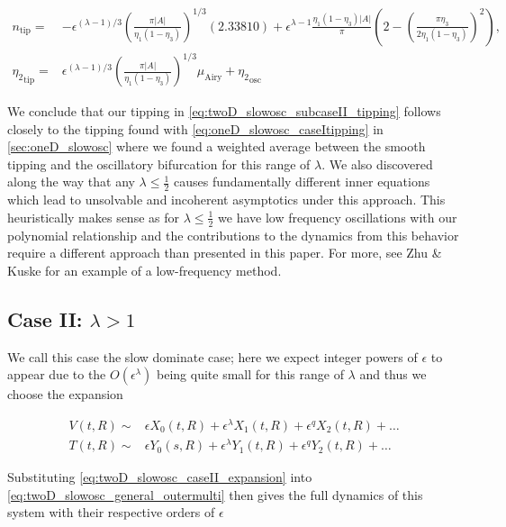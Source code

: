 \begin{equation}\label{eq:twoD_slowosc_subcaseII_tipping}
\begin{aligned}
n_{\text{tip}} =& -\epsilon^{(\lambda-1)/3}\left(\frac{\pi|A|}{\eta_1(1-\eta_3)}\right)^{1/3}(2.33810)+\epsilon^{\lambda-1}\frac{\eta_1(1-\eta_3)|A|}{\pi}\left(2-\left(\frac{\pi\eta_3}{2\eta_1(1-\eta_3)}\right)^2\right),\\
{\eta_2}_{\text{tip}} =& \epsilon^{(\lambda-1)/3}\left(\frac{\pi|A|}{\eta_1(1-\eta_3)}\right)^{1/3}\mu_{\text{Airy}}+{\eta_2}_{\text{osc}}
\end{aligned}
\end{equation}

We conclude that our tipping in \eqref{eq:twoD_slowosc_subcaseII_tipping} follows closely to the tipping found with \eqref{eq:oneD_slowosc_caseItipping} in \autoref{sec:oneD_slowosc} where we found a weighted average between the smooth tipping and the oscillatory bifurcation for this range of $\lambda$. We also discovered along the way that any $\lambda\le\frac{1}{2}$ causes fundamentally different inner equations which lead to unsolvable and incoherent asymptotics under this approach. This heuristically makes sense as for $\lambda\le \frac{1}{2}$ we have low frequency oscillations with our polynomial relationship and the contributions to the dynamics from this behavior require a different approach than presented in this paper. For more, see Zhu \& Kuske \cite{zhu2015tipping} for an example of a low-frequency method.

\subsection{Case II: $\lambda>1$}

We call this case the slow dominate case; here we expect integer powers of $\epsilon$ to appear due to the $O(\epsilon^\lambda)$ being quite small for this range of $\lambda$ and thus we choose the expansion 

\begin{equation}\label{eq:twoD_slowosc_caseII_expansion}
\begin{aligned}
V(t,R) \sim& \epsilon X_0(t,R)+\epsilon^\lambda X_1(t,R)+\epsilon^q X_2(t,R)+\ldots\\
T(t,R) \sim& \epsilon Y_0(s,R) + \epsilon^\lambda Y_1(t,R) +\epsilon^q Y_2(t,R)+\ldots
\end{aligned}
\end{equation}

Substituting \eqref{eq:twoD_slowosc_caseII_expansion} into \eqref{eq:twoD_slowosc_general_outermulti} then gives the full dynamics of this system with their respective orders of $\epsilon$

